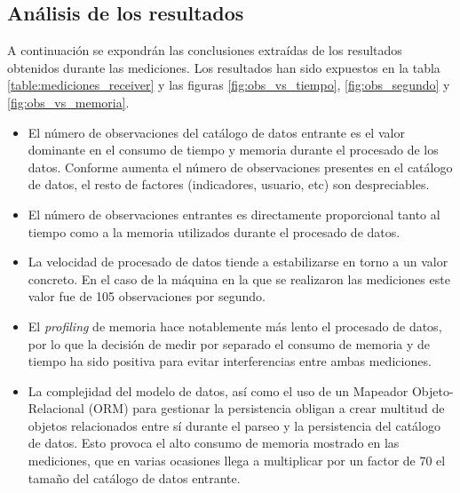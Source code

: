 \subsection{Análisis de los resultados}
	A continuación se expondrán las conclusiones extraídas de los resultados obtenidos durante las mediciones. Los resultados han sido expuestos en la tabla \ref{table:mediciones_receiver} y las figuras \ref{fig:obs_vs_tiempo}, \ref{fig:obs_segundo} y \ref{fig:obs_vs_memoria}.
	\begin{itemize}
		\item
			El número de observaciones del catálogo de datos entrante es el valor dominante en el consumo de tiempo y memoria durante el procesado de los datos.  Conforme aumenta el número de observaciones presentes en el catálogo de datos, el resto de factores (indicadores, usuario, etc) son despreciables.
		\item
			El número de observaciones entrantes es directamente proporcional tanto al tiempo como a la memoria utilizados durante el procesado de datos. 
		\item
			La velocidad de procesado de datos tiende a estabilizarse en torno a un valor concreto.  En el caso de la máquina en la que se realizaron las mediciones este valor fue de 105 observaciones por segundo.
		\item
			El \textit{profiling} de memoria hace notablemente más lento el procesado de datos, por lo que la decisión de medir por separado el consumo de memoria y de tiempo ha sido positiva para evitar interferencias entre ambas mediciones.
		\item
			La complejidad del modelo de datos, así como el uso de un Mapeador Objeto-Relacional (ORM) para gestionar la persistencia obligan a crear multitud de objetos relacionados entre sí durante el parseo y la persistencia del catálogo de datos.  Esto provoca el alto consumo de memoria mostrado en las mediciones, que en varias ocasiones llega a multiplicar por un factor de 70 el tamaño del catálogo de datos entrante.
	\end{itemize}
